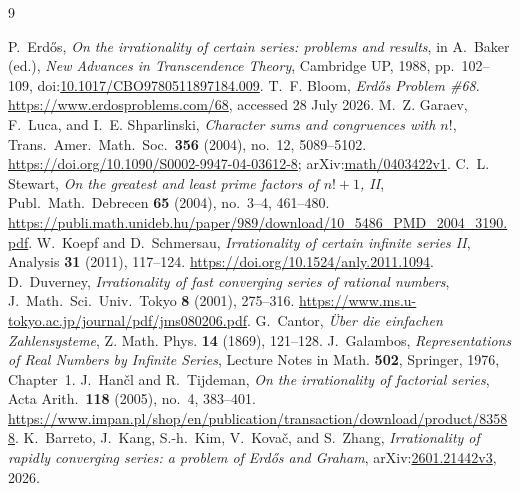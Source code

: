 \documentclass[11pt]{article}
\begin{document}
\clearpage
\begin{thebibliography}{9}
\small
\raggedright
\setlength{\itemsep}{0pt}
 P.~Erd\H{o}s, \emph{On the irrationality of certain series:
  problems and results}, in A.~Baker (ed.), \emph{New Advances in Transcendence
  Theory}, Cambridge UP, 1988, pp.~102--109,
  doi:\href{https://doi.org/10.1017/CBO9780511897184.009}
  {10.1017/CBO9780511897184.009}.
 T.~F. Bloom, \emph{Erd\H{o}s Problem \#68}.
  \url{https://www.erdosproblems.com/68}, accessed 28 July 2026.
  M.~Z. Garaev, F.~Luca, and I.~E. Shparlinski,
  \emph{Character sums and congruences with $n!$},
  Trans.\ Amer.\ Math.\ Soc.\ \textbf{356} (2004), no.~12, 5089--5102.
  \url{https://doi.org/10.1090/S0002-9947-04-03612-8};
  arXiv:\href{https://arxiv.org/abs/math/0403422}{math/0403422v1}.
  C.~L. Stewart,
  \emph{On the greatest and least prime factors of $n!+1$, II},
  Publ.\ Math.\ Debrecen \textbf{65} (2004), no.~3--4, 461--480.
  \url{https://publi.math.unideb.hu/paper/989/download/10_5486_PMD_2004_3190.pdf}.
  W.~Koepf and D.~Schmersau,
  \emph{Irrationality of certain infinite series II},
  Analysis \textbf{31} (2011), 117--124.
  \url{https://doi.org/10.1524/anly.2011.1094}.
  D.~Duverney,
  \emph{Irrationality of fast converging series of rational numbers},
  J.\ Math.\ Sci.\ Univ.\ Tokyo \textbf{8} (2001), 275--316.
  \url{https://www.ms.u-tokyo.ac.jp/journal/pdf/jms080206.pdf}.
 G.~Cantor, \emph{\"Uber die einfachen Zahlensysteme},
  Z. Math. Phys. \textbf{14} (1869), 121--128.
 J.~Galambos, \emph{Representations of Real Numbers by
  Infinite Series}, Lecture Notes in Math. \textbf{502}, Springer, 1976,
  Chapter~1.
  J.~Han\v{c}l and R.~Tijdeman,
  \emph{On the irrationality of factorial series},
  Acta Arith.\ \textbf{118} (2005), no.~4, 383--401.
  \url{https://www.impan.pl/shop/en/publication/transaction/download/product/83588}.
  K.~Barreto, J.~Kang, S.-h.~Kim, V.~Kova\v{c}, and S.~Zhang,
  \emph{Irrationality of rapidly converging series: a problem of Erd\H{o}s
  and Graham},
  arXiv:\href{https://arxiv.org/abs/2601.21442v3}{2601.21442v3}, 2026.
\end{thebibliography}
\end{document}
